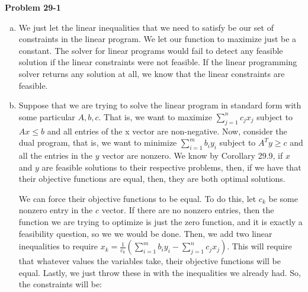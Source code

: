 \documentclass{article}
\begin{document}
\noindent\textbf{Problem 29-1}\\
\begin{enumerate}[a.]
\item
We just let the linear inequalities that we need to satisfy be our set of constraints in the linear program. We let our function to maximize just be a constant. The solver for linear programs would fail to detect any feasible solution if the linear constraints were not feasible. If the linear programming solver returns any solution at all, we know that the linear constraints are feasible. 
\item
\begin{comment}
Take the constraints of the linear program together with the constraints of its dual. Together, if these constraints are satisfied, then there must be an optimal solution which is equal to any solution of all the constraints. This approach assumes that the linear feasibility tester doesn't just say whether or not the linear inequalities are all simultaneously satisfiable, but actually gives an assignment to the variables that satisfies them. We can see that if we can get all of these inequalities simultaneously satisfied, then we must have that our solution is optimal by the duality theorem, which says that the optimal solution to the linear program is also an optimal solution to the dual of the linear program.
\end{comment}
Suppose that we are trying to solve the linear program in standard form with some particular $A,b,c$. That is, we want to maximize $\sum_{j=1}^n c_j x_j$ subject to $Ax \le b$ and all entries of the x vector are non-negative. Now, consider the dual program, that is, we want to minimize $\sum_{i=1}^m b_i y_i$ subject to $A^T y \ge c$ and all the entries in the $y$ vector are nonzero. We know by Corollary 29.9, if $x$ and $y$ are feasible solutions to their respective problems, then, if we have that their objective functions are equal, then, they are both optimal solutions. 

We can force their objective functions to be equal. To do this, let $c_k$ be some nonzero entry in the $c$ vector. If there are no nonzero entries, then the function we are trying to optimize is just the zero function, and it is exactly a feasibility question, so we we would be done. Then, we add two linear inequalities to require $x_k = \frac{1}{c_k} \left(\sum_{i=1}^m b_i y_i - \sum_{j=1}^n c_j x_j\right)$. This will require that whatever values the variables take, their objective functions will be equal. Lastly, we just throw these in with the inequalities we already had. So, the constraints will be:



\end{enumerate}
\end{document}
